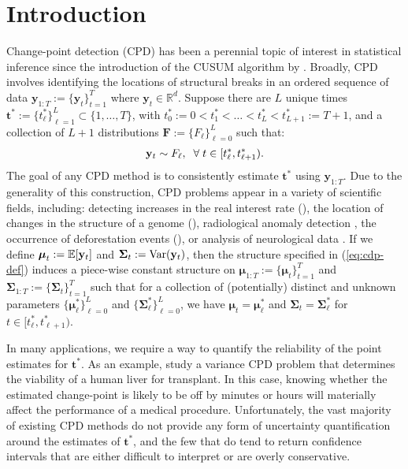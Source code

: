 \section{Introduction}
\label{sec:intro}

Change-point detection (CPD) has been a perennial topic of interest in statistical inference since the introduction of the CUSUM algorithm by \cite{Page54}. Broadly, CPD involves identifying the locations of structural breaks in an ordered sequence of data $\mathbf{y}_{1:T}:= \{\mathbf{y}_t\}_{t=1}^T$ where $\mathbf{y}_t \in \mathbb{R}^d$. Suppose there are $L$ unique times $\mathbf{t}^*:=\{t^*_\ell\}_{\ell=1}^{L} \subset \{1,\ldots,T\}$, with $t^*_0:=0 < t_1^* < \ldots< t_L^* <t^*_{L+1} := T+1$, and a collection of $L+1$ distributions $\mathbf{F} := \{F_\ell\}_{\ell=0}^L$ such that:
\begin{align}\label{eq:cdp-def}
    \mathbf{y}_t \sim F_\ell, \;\;\forall\; t \in [t^*_\ell,t^*_{\ell+1}).
\end{align}
The goal of any CPD method is to consistently estimate $\mathbf{t}^*$ using $\mathbf{y}_{1:T}$. Due to the generality of this construction, CPD problems appear in a variety of scientific fields, including: detecting increases in the real interest rate (\citealp{Bai03}), the location of changes in the structure of a genome (\citealp{Muggeo11}), radiological anomaly detection \citep{madrid2019sequential}, the occurrence of deforestation events (\citealp{Wendelberger21}), or analysis of neurological data \citep{padilla2022change}. If we define $\boldsymbol{\mu}_t := \mathbb{E}[\mathbf{y}_t]$ and $\boldsymbol{\Sigma}_t := \text{\normalfont Var}(\mathbf{y}_t)$, then the structure specified in (\ref{eq:cdp-def}) induces a piece-wise constant structure on $\boldsymbol{\mu}_{1:T} := \{\boldsymbol{\mu}_t\}_{t=1}^T$ and $\boldsymbol{\Sigma}_{1:T} := \{\boldsymbol{\Sigma}_t\}_{t=1}^T$ such that for a collection of (potentially) distinct and unknown parameters $\{\boldsymbol{\mu}^*_\ell\}_{\ell=0}^{L}$ and $\{\boldsymbol{\Sigma}^*_\ell\}_{\ell=0}^{L}$, we have $\boldsymbol{\mu}_t = \boldsymbol{\mu}^*_\ell$ and $\boldsymbol{\Sigma}_t = \boldsymbol{\Sigma}^*_\ell$ for $t \in [t^*_\ell,t^*_{\ell+1})$. 

In many applications, we require a way to quantify the reliability of the point estimates for $\mathbf{t}^*$. As an example, \cite{Gao19} study a variance CPD problem that determines the viability of a human liver for transplant. In this case, knowing whether the estimated change-point is likely to be off by minutes or hours will materially affect the performance of a medical procedure. Unfortunately, the vast majority of existing CPD methods do not provide any form of uncertainty quantification around the estimates of $\mathbf{t}^*$, and the few that do tend to return confidence intervals that are either difficult to interpret or are overly conservative. 

